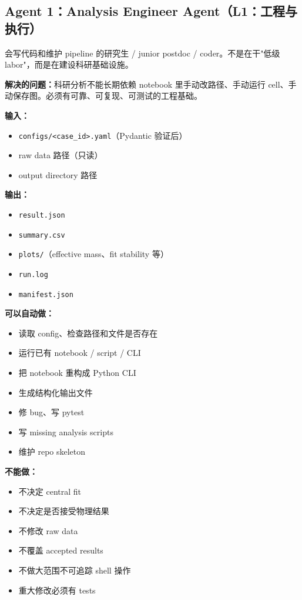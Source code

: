 \documentclass[11pt,a4paper,fontset=fandol]{ctexart}
\begin{document}
\newpage
\subsection{Agent 1：Analysis Engineer Agent（L1：工程与执行）}

\begin{tcolorbox}[colback=gray!5,colframe=gray!50,title=真实科研组类比]
会写代码和维护 pipeline 的研究生 / junior postdoc / coder。不是在干"低级 labor"，而是在建设科研基础设施。
\end{tcolorbox}

\textbf{解决的问题：}科研分析不能长期依赖 notebook 里手动改路径、手动运行 cell、手动保存图。必须有可靠、可复现、可测试的工程基础。

\textbf{输入：}
\begin{itemize}
  \item \texttt{configs/<case\_id>.yaml}（Pydantic 验证后）
  \item raw data 路径（只读）
  \item output directory 路径
\end{itemize}

\textbf{输出：}
\begin{itemize}
  \item \texttt{result.json}
  \item \texttt{summary.csv}
  \item \texttt{plots/}（effective mass、fit stability 等）
  \item \texttt{run.log}
  \item \texttt{manifest.json}
\end{itemize}

\textbf{可以自动做：}
\begin{itemize}
  \item 读取 config、检查路径和文件是否存在
  \item 运行已有 notebook / script / CLI
  \item 把 notebook 重构成 Python CLI
  \item 生成结构化输出文件
  \item 修 bug、写 pytest
  \item 写 missing analysis scripts
  \item 维护 repo skeleton
\end{itemize}

\textbf{不能做：}
\begin{itemize}
  \item 不决定 central fit
  \item 不决定是否接受物理结果
  \item 不修改 raw data
  \item 不覆盖 accepted results
  \item 不做大范围不可追踪 shell 操作
  \item 重大修改必须有 tests
\end{itemize}
\end{document}
